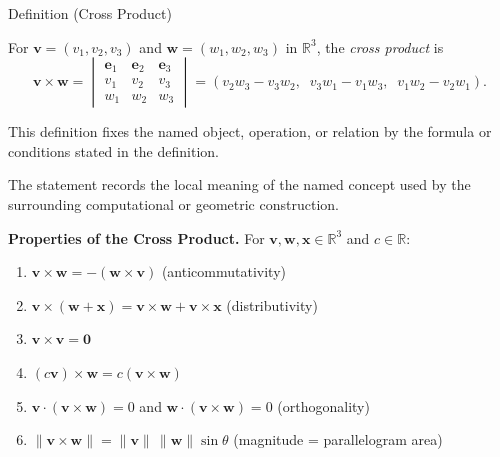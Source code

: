 \begin{definitionbox}{Definition (Cross Product)}
\begin{definition}
\label{def:cross-product}
For $\mathbf{v} = (v_1, v_2, v_3)$ and $\mathbf{w} = (w_1, w_2, w_3)$ in $\mathbb{R}^3$,
the \emph{cross product} is
\[
  \mathbf{v} \times \mathbf{w}
  = \begin{vmatrix} \mathbf{e}_1 & \mathbf{e}_2 & \mathbf{e}_3 \\
                    v_1 & v_2 & v_3 \\
                    w_1 & w_2 & w_3
    \end{vmatrix}
  = (v_2 w_3 - v_3 w_2,\;\; v_3 w_1 - v_1 w_3,\;\; v_1 w_2 - v_2 w_1).
\]
\end{definition}
\end{definitionbox}
\begin{remark*}
This definition fixes the named object, operation, or relation by the formula
or conditions stated in the definition.
\end{remark*}

\begin{remark*}[Interpretation]
The statement records the local meaning of the named concept used by the
surrounding computational or geometric construction.
\end{remark*}

\DefinitionalRoot

\begin{remark*}[Exposition]
\textbf{Properties of the Cross Product.}
For $\mathbf{v}, \mathbf{w}, \mathbf{x} \in \mathbb{R}^3$ and $c \in \mathbb{R}$:
\begin{enumerate}
  \item $\mathbf{v} \times \mathbf{w} = -(\mathbf{w} \times \mathbf{v})$ \hfill (anticommutativity)
  \item $\mathbf{v} \times (\mathbf{w} + \mathbf{x}) = \mathbf{v} \times \mathbf{w} + \mathbf{v} \times \mathbf{x}$ \hfill (distributivity)
  \item $\mathbf{v} \times \mathbf{v} = \mathbf{0}$
  \item $(c\mathbf{v}) \times \mathbf{w} = c(\mathbf{v} \times \mathbf{w})$
  \item $\mathbf{v} \cdot (\mathbf{v} \times \mathbf{w}) = 0$ and $\mathbf{w} \cdot (\mathbf{v} \times \mathbf{w}) = 0$ \hfill (orthogonality)
  \item $\|\mathbf{v} \times \mathbf{w}\| = \|\mathbf{v}\|\,\|\mathbf{w}\|\sin\theta$ \hfill (magnitude = parallelogram area)
\end{enumerate}
\end{remark*}

